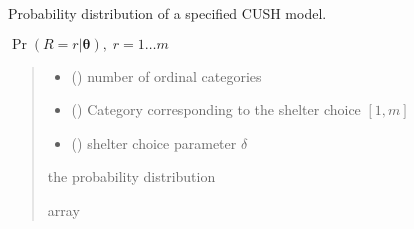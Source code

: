 \documentclass[letterpaper,10pt,english]{sphinxmanual}
\begin{document}
\begin{fulllineitems}
\label{\detokenize{cubmods:cubmods.cush.pmf}}
\pysigstartsignatures
{}
\pysigstopsignatures
\sphinxAtStartPar
Probability distribution of a specified CUSH model.

\sphinxAtStartPar
\(\Pr(R = r | \pmb\theta),\; r=1 \ldots m\)
\begin{quote}\begin{description}
\begin{itemize}
\item {} 
\sphinxAtStartPar
{} () \textendash{} number of ordinal categories

\item {} 
\sphinxAtStartPar
{} () \textendash{} Category corresponding to the shelter choice \([1,m]\)

\item {} 
\sphinxAtStartPar
{} () \textendash{} shelter choice parameter \(\delta\)

\end{itemize}

\sphinxAtStartPar
the probability distribution

\sphinxAtStartPar
array

\end{description}\end{quote}

\end{fulllineitems}

\end{document}

